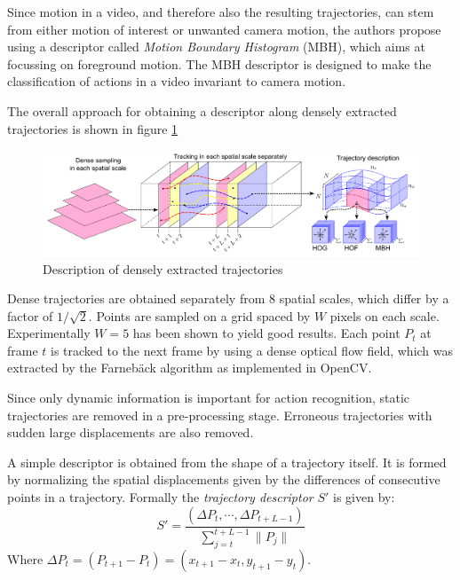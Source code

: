 Since motion in a video, and therefore also the resulting trajectories, can stem from either motion of interest or unwanted camera motion, the authors propose using a descriptor called \textit{Motion Boundary Histogram} (MBH), which aims at focussing on foreground motion.
The MBH descriptor is designed to make the classification of actions in a video invariant to camera motion.

The overall approach for obtaining a descriptor along densely extracted trajectories is shown in figure \ref{fig:densetrajectories_approach}

\begin{figure}[H]
    \centering
    \includegraphics[width=\textwidth]{img_conventional/densetrajectories_approach}
    \caption{Description of densely extracted trajectories \cite{wang_action_2011}}
    \label{fig:densetrajectories_approach}
\end{figure}

Dense trajectories are obtained separately from 8 spatial scales, which differ by a factor of $1 / \sqrt{2}$.
Points are sampled on a grid spaced by $W$ pixels on each scale. Experimentally $W = 5$ has been shown to yield good results.
Each point $P_t$ at frame $t$ is tracked to the next frame by using a dense optical flow field, which was extracted by the Farnebäck algorithm \cite{farneback_two-frame_2003} as implemented in OpenCV.

Since only dynamic information is important for action recognition, static trajectories are removed in a pre-processing stage.
Erroneous trajectories with sudden large displacements are also removed.

A simple descriptor is obtained from the shape of a trajectory itself.
It is formed by normalizing the spatial displacements given by the differences of consecutive points in a trajectory.
Formally the \textit{trajectory descriptor} $S'$ is given by:
\begin{equation*}
    S' = \frac{(\Delta P_t, \cdots, \Delta P_{t+L-1})}{\sum_{j=t}^{t+L-1} \|P_j\|}
\end{equation*}
Where $\Delta P_t = (P_{t+1} - P_t) = (x_{t+1} - x_t, y_{t+1} - y_t)$.

